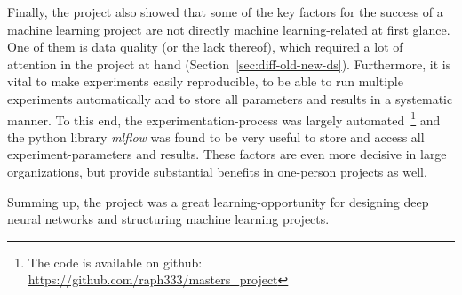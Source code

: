 Finally, the project also showed that some of the key factors for the success of a machine learning project are not directly machine learning-related at first glance. One of them is data quality (or the lack thereof), which required a lot of attention in the project at hand (Section~\ref{sec:diff-old-new-ds}). Furthermore, it is vital to make experiments easily reproducible, to be able to run multiple experiments automatically and to store all parameters and results in a systematic manner. To this end, the experimentation-process was largely automated~\footnote{The code is available on github: \url{https://github.com/raph333/masters_project}} and the python library \textit{mlflow} was found to be very useful to store and access all experiment-parameters and results. These factors are even more decisive in large organizations, but provide substantial benefits in one-person projects as well.

Summing up, the project was a great learning-opportunity for designing deep neural networks and structuring machine learning projects.